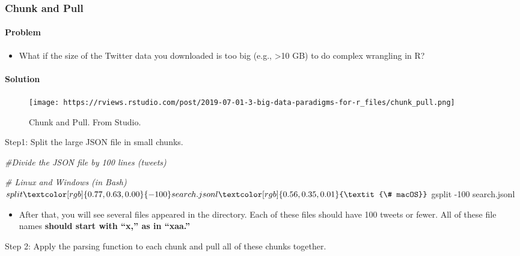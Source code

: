 \documentclass[
]{book}
\newenvironment{Shaded}{\begin{snugshade}}{\end{snugshade}}
\newcommand{\AttributeTok}[1]{\textcolor[rgb]{0.77,0.63,0.00}{#1}}
\newcommand{\CommentTok}[1]{\textcolor[rgb]{0.56,0.35,0.01}{\textit{#1}}}
\newcommand{\ExtensionTok}[1]{#1}
\newcommand{\NormalTok}[1]{#1}
\providecommand{\tightlist}{%
  \setlength{\itemsep}{0pt}\setlength{\parskip}{0pt}}
\begin{document}
\hypertarget{chunk-and-pull}{%
\subsubsection{Chunk and Pull}\label{chunk-and-pull}}

\hypertarget{problem-3}{%
\paragraph{Problem}\label{problem-3}}

\begin{itemize}
\tightlist
\item
  What if the size of the Twitter data you downloaded is too big (e.g., \textgreater10 GB) to do complex wrangling in R?
\end{itemize}

\hypertarget{solution-2}{%
\paragraph{Solution}\label{solution-2}}

\begin{figure}
\centering
\texttt{[image: https://rviews.rstudio.com/post/2019-07-01-3-big-data-paradigms-for-r\_files/chunk\_pull.png]}
\caption{Chunk and Pull. From Studio.}
\end{figure}

Step1: Split the large JSON file in small chunks.

\begin{Shaded}
\begin{Highlighting}[]
\CommentTok{\#Divide the JSON file by 100 lines (tweets)}

\CommentTok{\# Linux and Windows (in Bash)}
\ExtensionTok{$}\NormalTok{ split }\AttributeTok{{-}100}\NormalTok{ search.jsonl}

\CommentTok{\# macOS}
\ExtensionTok{$}\NormalTok{ gsplit }\AttributeTok{{-}100}\NormalTok{ search.jsonl}
\end{Highlighting}
\end{Shaded}

\begin{itemize}
\tightlist
\item
  After that, you will see several files appeared in the directory. Each of these files should have 100 tweets or fewer. All of these file names \textbf{should start with ``x,'' as in ``xaa.''}
\end{itemize}

Step 2: Apply the parsing function to each chunk and pull all of these chunks together.
\end{document}
